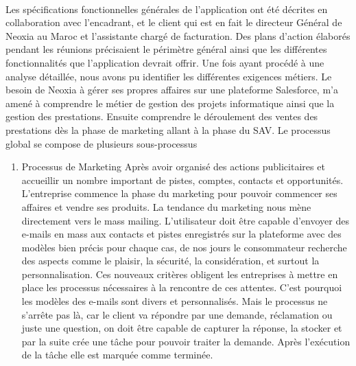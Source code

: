 \documentclass[a4paper, 12pt]{report}
\begin{document}
\begin{itemize}
\paragraph{}
Les spécifications fonctionnelles générales de l'application ont été décrites en collaboration avec l'encadrant, et le client qui est en fait le directeur Général de Neoxia au Maroc et l'assistante chargé de facturation. Des plans d'action élaborés pendant les réunions précisaient le périmètre général ainsi que les différentes fonctionnalités que l'application devrait offrir. Une fois ayant procédé à une analyse détaillée, nous avons pu identifier les différentes exigences métiers. 
Le besoin de Neoxia à gérer ses propres affaires sur une plateforme Salesforce, m'a amené à comprendre le métier de gestion des projets informatique ainsi que la gestion des prestations.
Ensuite comprendre le déroulement des ventes des prestations dès la phase de marketing allant à la phase du SAV.
Le processus global se compose de plusieurs sous-processus
\begin{enumerate}
	\item {	Processus de Marketing}
	Après avoir organisé des actions publicitaires et accueillir un nombre important de pistes, comptes, contacts et opportunités.
L'entreprise commence la phase du marketing pour pouvoir commencer ses affaires et vendre ses produits.
La tendance du marketing nous mène directement vers le mass mailing.
L'utilisateur doit être capable d'envoyer des e-mails en mass aux contacts et pistes enregistrés sur la plateforme avec des modèles bien précis pour chaque cas,  de nos jours le consommateur recherche des aspects comme le plaisir, la sécurité, la considération, et surtout la personnalisation. Ces nouveaux critères obligent les entreprises à mettre en place les processus nécessaires à la rencontre de ces attentes.
C'est pourquoi les modèles des e-mails sont divers et personnalisés.
Mais le processus ne s'arrête pas là, car le client va répondre par une demande, réclamation ou juste une question, on doit être capable de capturer la réponse, la stocker et par la suite crée une tâche pour pouvoir traiter la demande.
Après l'exécution de la tâche elle est marquée comme terminée. 


\end{enumerate}
\end{itemize}
\end{document}
